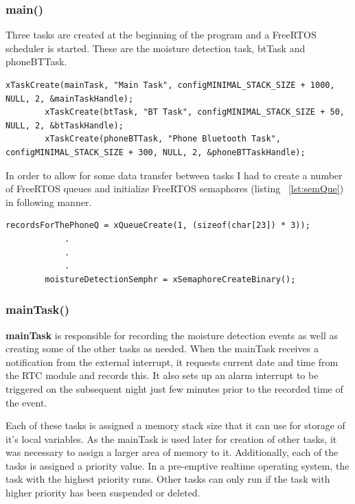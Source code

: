 \documentclass[12pt,a4paper]{article}
\begin{document}
        \subsubsection*{main()}
        Three tasks are created at the beginning of the program and a FreeRTOS scheduler is started. These are the moisture detection task, btTask and phoneBTTask.
        \begin{lstlisting}[label={lst:itCreation}, caption=Initial Task Creation]
        xTaskCreate(mainTask, "Main Task", configMINIMAL_STACK_SIZE + 1000, NULL, 2, &mainTaskHandle);
        xTaskCreate(btTask, "BT Task", configMINIMAL_STACK_SIZE + 50, NULL, 2, &btTaskHandle);
        xTaskCreate(phoneBTTask, "Phone Bluetooth Task", configMINIMAL_STACK_SIZE + 300, NULL, 2, &phoneBTTaskHandle);
        \end{lstlisting}
        In order to allow for some data transfer between tasks I had to create a number of FreeRTOS queues and initialize FreeRTOS semaphores (listing ~\ref{lst:semQue}) in following manner. 
        \begin{lstlisting}[label={lst:semQue}, caption=Semaphores and Queues]
        recordsForThePhoneQ = xQueueCreate(1, (sizeof(char[23]) * 3));
            .
            .
            .
        moistureDetectionSemphr = xSemaphoreCreateBinary();
        \end{lstlisting}
        
        \subsubsection*{mainTask()}
        {\bfseries mainTask} is responsible for recording the moisture detection events as well as creating some of the other tasks as needed. When the mainTask receives a notification from the external interrupt, it requests current date and time from the RTC module and records this. It also sets up an alarm interrupt to be triggered on the subsequent night just few minutes prior to the recorded time of the event.  
        
        Each of these tasks is assigned a memory stack size that it can use for storage of it's local variables. As the mainTask is used later for creation of other tasks, it was  necessary to assign a larger area of memory to it. Additionally, each of the tasks is assigned a priority value. In a  pre-emptive realtime operating system, the task with the highest priority runs. Other tasks can only run if the task with higher priority has been suspended or deleted.\\
        
\end{document}
